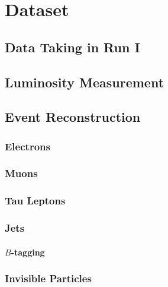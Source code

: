 \chapter{Dataset}

\section{Data Taking in Run I}

\section{Luminosity Measurement}

\section{Event Reconstruction}


\subsection{Electrons}

\subsection{Muons}

\subsection{Tau Leptons}

\subsection{Jets}

\subsubsection{$B$-tagging}

\subsection{Invisible Particles}
